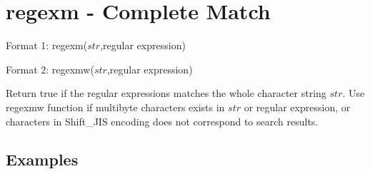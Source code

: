 
%

\section{regexm - Complete Match\label{sect:regexm}}

Format 1: regexm($str$,regular expression)

Format 2: regexmw($str$,regular expression)

Return true if the regular expressions matches the whole character string $str$. Use regexmw function if multibyte characters exists in $str$ or regular expression, or characters in Shift\_JIS encoding does not correspond to search results. 

\subsection*{Examples}


%

